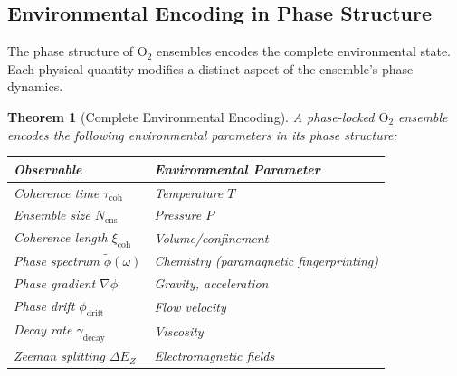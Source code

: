 \documentclass[twocolumn,10pt]{article}
\newtheorem{theorem}{Theorem}[section]
\theoremstyle{definition}
\theoremstyle{remark}
\newcommand{\xicoh}{\xi_{\mathrm{coh}}}
\newcommand{\Nens}{N_{\mathrm{ens}}}
\begin{document}
\subsection{Environmental Encoding in Phase Structure}

The phase structure of $\mathrm{O}_2$ ensembles encodes the complete environmental state. Each physical quantity modifies a distinct aspect of the ensemble's phase dynamics.

\begin{theorem}[Complete Environmental Encoding]
\label{thm:env_encoding}
A phase-locked $\mathrm{O}_2$ ensemble encodes the following environmental parameters in its phase structure:
\begin{center}
\begin{tabular}{@{}ll@{}}
\toprule
\textbf{Observable} & \textbf{Environmental Parameter} \\
\midrule
Coherence time $\tau_{\mathrm{coh}}$ & Temperature $T$ \\
Ensemble size $\Nens$ & Pressure $P$ \\
Coherence length $\xicoh$ & Volume/confinement \\
Phase spectrum $\tilde{\phi}(\omega)$ & Chemistry (paramagnetic fingerprinting) \\
Phase gradient $\nabla\phi$ & Gravity, acceleration \\
Phase drift $\phi_{\mathrm{drift}}$ & Flow velocity \\
Decay rate $\gamma_{\mathrm{decay}}$ & Viscosity \\
Zeeman splitting $\Delta E_Z$ & Electromagnetic fields \\
\bottomrule
\end{tabular}
\end{center}
\end{theorem}
\end{document}

